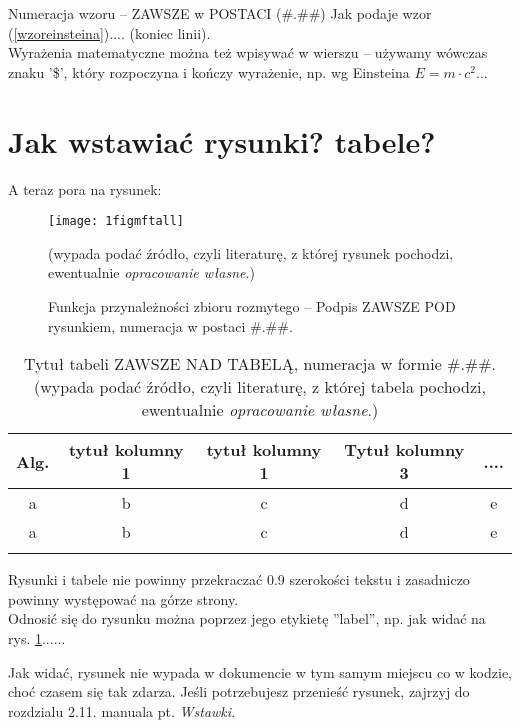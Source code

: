 \documentclass[12pt]{report}
\begin{document}
\indent Numeracja wzoru -- ZAWSZE w POSTACI (\#.\#\#)
Jak podaje wzor (\ref{wzoreinsteina}).... (koniec linii). \\
\indent Wyrażenia matematyczne można też wpisywać w wierszu -- używamy wów\-czas znaku '\$', który rozpoczyna i kończy wyrażenie, np. wg Einsteina $E=m\cdot c^2$...


\section{Jak wstawiać rysunki? tabele? }
A teraz pora na rysunek:
\begin{figure}[!t]
\centering
\texttt{[image: 1figmftall]} 
\caption{Funkcja przynależności zbioru rozmytego -- Podpis ZAWSZE POD rysunkiem,
numeracja w postaci \#.\#\#. } (wypada podać źródło, czyli literaturę,
z której rysunek pochodzi, ewentualnie {\em opracowanie własne}.)
\label{fig.funkcja.przyn}
\end{figure}


\begin{table}[!t]
\centering
\caption{Tytuł tabeli ZAWSZE NAD TABELĄ, numeracja w formie \#.\#\#. (wypada podać źródło, czyli literaturę,
z której tabela pochodzi, ewentualnie {\em opracowanie własne}.)} 

\label{tabls1}

{\footnotesize 
\vspace{5mm}
\begin{tabular}{c c c c c}
\hline\noalign{\smallskip}
{\bf Alg.} & {\bf tytuł kolumny 1} & {\bf tytuł kolumny 1} & {\bf Tytuł kolumny
3} & {\bf ....}     \\

\hline\noalign{\smallskip}
a & b & c & d & e  \vspace{3mm} \\ 
\noalign{\smallskip}
 a & b & c & d & e \\

\noalign{\smallskip}
\end{tabular}
}
\end{table}


Rysunki i tabele nie powinny przekraczać 0.9 szerokości tekstu i zasadniczo
powinny występować na górze strony. \\

\indent Odnosić się do rysunku można poprzez jego etykietę ''label'', np. jak widać na rys. \ref{fig.funkcja.przyn}......

Jak widać, rysunek nie wypada w dokumencie w tym samym miejscu co w kodzie, choć czasem się tak zdarza. Jeśli potrzebujesz przenieść rysunek, zajrzyj do rozdzialu 2.11. manuala pt. {\em Wstawki}. 
\end{document}
